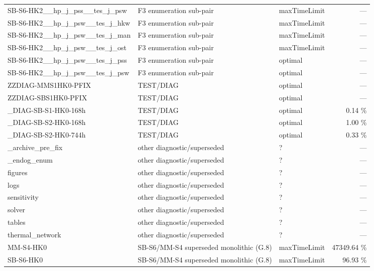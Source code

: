 \begin{table}[htbp]
\begin{tabular}{lllr}
  SB-S6-HK2\_\_hp\_j\_pss\_\_tes\_j\_psw & F3 enumeration sub-pair & maxTimeLimit & — \\
  SB-S6-HK2\_\_hp\_j\_psw\_\_tes\_j\_hkw & F3 enumeration sub-pair & maxTimeLimit & — \\
  SB-S6-HK2\_\_hp\_j\_psw\_\_tes\_j\_man & F3 enumeration sub-pair & maxTimeLimit & — \\
  SB-S6-HK2\_\_hp\_j\_psw\_\_tes\_j\_ost & F3 enumeration sub-pair & maxTimeLimit & — \\
  SB-S6-HK2\_\_hp\_j\_psw\_\_tes\_j\_pss & F3 enumeration sub-pair & optimal & — \\
  SB-S6-HK2\_\_hp\_j\_psw\_\_tes\_j\_psw & F3 enumeration sub-pair & optimal & — \\
  ZZDIAG-MMS1HK0-PFIX & TEST/DIAG & optimal & — \\
  ZZDIAG-SBS1HK0-PFIX & TEST/DIAG & optimal & — \\
  \_DIAG-SB-S1-HK0-168h & TEST/DIAG & optimal & 0.14 \% \\
  \_DIAG-SB-S2-HK0-168h & TEST/DIAG & optimal & 1.00 \% \\
  \_DIAG-SB-S2-HK0-744h & TEST/DIAG & optimal & 0.33 \% \\
  \_archive\_pre\_fix & other diagnostic/superseded & ? & — \\
  \_endog\_enum & other diagnostic/superseded & ? & — \\
  figures & other diagnostic/superseded & ? & — \\
  logs & other diagnostic/superseded & ? & — \\
  sensitivity & other diagnostic/superseded & ? & — \\
  solver & other diagnostic/superseded & ? & — \\
  tables & other diagnostic/superseded & ? & — \\
  thermal\_network & other diagnostic/superseded & ? & — \\
  MM-S4-HK0 & SB-S6/MM-S4 superseded monolithic (G.8) & maxTimeLimit & 47349.64 \% \\
  SB-S6-HK0 & SB-S6/MM-S4 superseded monolithic (G.8) & maxTimeLimit & 96.93 \% \\
  \bottomrule
  \end{tabular}
\end{table}
